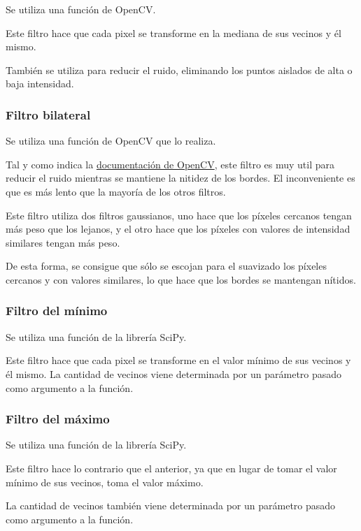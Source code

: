\documentclass[12pt]{article}
\begin{document}
Se utiliza una función de OpenCV.

Este filtro hace que cada pixel se transforme en la mediana de sus vecinos y él mismo.

También se utiliza para reducir el ruido, eliminando los puntos aislados de alta o baja intensidad.

\subsubsection*{Filtro bilateral}

Se utiliza una función de OpenCV que lo realiza.

Tal y como indica la \href{https://docs.opencv.org/4.x/d4/d86/group__imgproc__filter.html#ga564869aa33e58769b4469101aac458f9}{documentación de OpenCV}, este filtro es muy util para reducir el ruido mientras se mantiene la nitidez de los bordes. El inconveniente es que es más lento que la mayoría de los otros filtros.

Este filtro utiliza dos filtros gaussianos, uno hace que los píxeles cercanos tengan más peso que los lejanos, y el otro hace que los píxeles con valores de intensidad similares tengan más peso. 

De esta forma, se consigue que sólo se escojan para el suavizado los píxeles cercanos y con valores similares, lo que hace que los bordes se mantengan nítidos.

\subsubsection*{Filtro del mínimo}

Se utiliza una función de la librería SciPy.

Este filtro hace que cada pixel se transforme en el valor mínimo de sus vecinos y él mismo. La cantidad de vecinos viene determinada por un parámetro pasado como argumento a la función.


\subsubsection*{Filtro del máximo}

Se utiliza una función de la librería SciPy.

Este filtro hace lo contrario que el anterior, ya que en lugar de tomar el valor mínimo de sus vecinos, toma el valor máximo.

La cantidad de vecinos también viene determinada por un parámetro pasado como argumento a la función.
\end{document}
